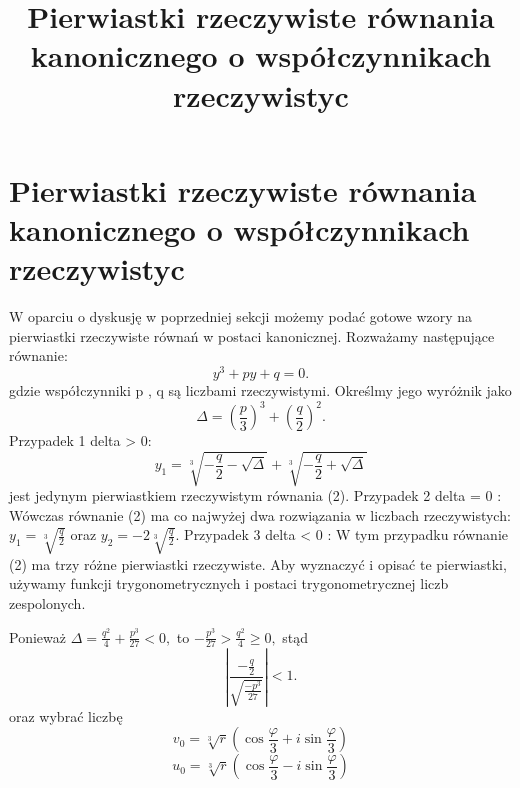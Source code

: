\documentclass{article}
\begin{document}
\title{Pierwiastki rzeczywiste równania kanonicznego o współczynnikach rzeczywistyc}
\maketitle

\section{Pierwiastki rzeczywiste równania kanonicznego o współczynnikach rzeczywistyc}
W oparciu o dyskusję w poprzedniej sekcji możemy podać gotowe wzory na pierwiastki rzeczywiste równań w postaci kanonicznej. Rozważamy następujące równanie: 
$${ y^{3}+py+q=0.}$$
gdzie współczynniki p , q są liczbami rzeczywistymi. Określmy jego wyróżnik jako $${ \Delta =\left({\frac {p}{3}}\right)^{3}+\left({\frac {q}{2}}\right)^{2}.}$$
Przypadek 1 delta > 0:
$$y_1=\sqrt[3]{-\frac{q}{2}-\sqrt{\Delta}}+\sqrt[3]{-\frac{q}{2}+\sqrt{\Delta}}$$
jest jedynym pierwiastkiem rzeczywistym równania (2). 
Przypadek 2   delta = 0 : 
Wówczas równanie (2) ma co najwyżej dwa rozwiązania w liczbach rzeczywistych: 
$y_1=\sqrt[3]{\frac{q}{2}}$ oraz $y_2=-2\sqrt[3]{\frac{q}{2}}.$
Przypadek 3   delta < 0 :
W tym przypadku równanie (2) ma trzy różne pierwiastki rzeczywiste. Aby wyznaczyć i opisać te pierwiastki, używamy funkcji trygonometrycznych i postaci trygonometrycznej liczb zespolonych.

Ponieważ $\Delta=\frac{q^2}{4}+\frac{p^3}{27}<0,$ to $-\frac{p^3}{27}>\frac{q^2}{4}\geq 0,$ stąd
$${ \left|{\frac {-{\frac {q}{2}}}{\sqrt {\frac {-p^{3}}{27}}}}\right|<1.}$$
oraz wybrać liczbę
$$v_0=\sqrt[3]{r}\left(\cos\frac{\varphi}{3}+i\sin\frac{\varphi}{3}\right)$$
$$u_0=\sqrt[3]{r}\left(\cos\frac{\varphi}{3}-i\sin\frac{\varphi}{3}\right)$$
\end{document}
